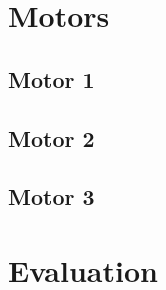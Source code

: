 \documentclass[12pt,3p]{report}
\begin{document}
\begin{multicols}{2}
	\section{Motors}
	
		\subsection{Motor 1}
	
	
	
		\subsection{Motor 2}
		
		
		
		\subsection{Motor 3}



	\section{Evaluation}


\newpage
\appendix







\end{multicols}
\end{document}
